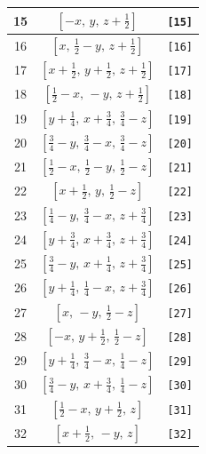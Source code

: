 \documentclass[fleqn,8pt]{jsarticle}
\begin{document}
\begin{longtable}{ccc}
15 & $\left[ - x,\, y,\, z + \frac{1}{2} \right]$ & {\tt [15]} \\ \hline
16 & $\left[ x,\, \frac{1}{2} - y,\, z + \frac{1}{2} \right]$ & {\tt [16]} \\ \hline
17 & $\left[ x + \frac{1}{2},\, y + \frac{1}{2},\, z + \frac{1}{2} \right]$ & {\tt [17]} \\ \hline
18 & $\left[ \frac{1}{2} - x,\, - y,\, z + \frac{1}{2} \right]$ & {\tt [18]} \\ \hline
19 & $\left[ y + \frac{1}{4},\, x + \frac{3}{4},\, \frac{3}{4} - z \right]$ & {\tt [19]} \\ \hline
20 & $\left[ \frac{3}{4} - y,\, \frac{3}{4} - x,\, \frac{3}{4} - z \right]$ & {\tt [20]} \\ \hline
21 & $\left[ \frac{1}{2} - x,\, \frac{1}{2} - y,\, \frac{1}{2} - z \right]$ & {\tt [21]} \\ \hline
22 & $\left[ x + \frac{1}{2},\, y,\, \frac{1}{2} - z \right]$ & {\tt [22]} \\ \hline
23 & $\left[ \frac{1}{4} - y,\, \frac{3}{4} - x,\, z + \frac{3}{4} \right]$ & {\tt [23]} \\ \hline
24 & $\left[ y + \frac{3}{4},\, x + \frac{3}{4},\, z + \frac{3}{4} \right]$ & {\tt [24]} \\ \hline
25 & $\left[ \frac{3}{4} - y,\, x + \frac{1}{4},\, z + \frac{3}{4} \right]$ & {\tt [25]} \\ \hline
26 & $\left[ y + \frac{1}{4},\, \frac{1}{4} - x,\, z + \frac{3}{4} \right]$ & {\tt [26]} \\ \hline
27 & $\left[ x,\, - y,\, \frac{1}{2} - z \right]$ & {\tt [27]} \\ \hline
28 & $\left[ - x,\, y + \frac{1}{2},\, \frac{1}{2} - z \right]$ & {\tt [28]} \\ \hline
29 & $\left[ y + \frac{1}{4},\, \frac{3}{4} - x,\, \frac{1}{4} - z \right]$ & {\tt [29]} \\ \hline
30 & $\left[ \frac{3}{4} - y,\, x + \frac{3}{4},\, \frac{1}{4} - z \right]$ & {\tt [30]} \\ \hline
31 & $\left[ \frac{1}{2} - x,\, y + \frac{1}{2},\, z \right]$ & {\tt [31]} \\ \hline
32 & $\left[ x + \frac{1}{2},\, - y,\, z \right]$ & {\tt [32]} \\
\end{longtable}
\end{document}
